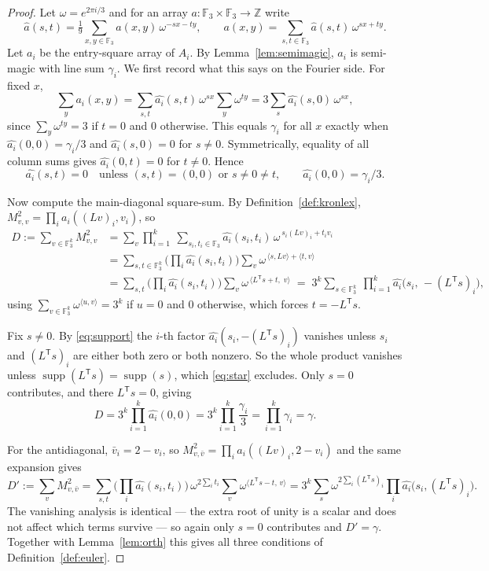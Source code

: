 \documentclass[11pt,a4paper]{amsart}
\theoremstyle{plain}
\theoremstyle{definition}
\theoremstyle{remark}
\newcommand{\FF}{\mathbb{F}}
\newcommand{\ZZ}{\mathbb{Z}}
\newcommand{\supp}{\operatorname{supp}}
\newcommand{\tr}{\mathsf{T}}
\begin{document}
\begin{proof}
Let $\omega=e^{2\pi i/3}$ and for an array $a:\FF_3\times\FF_3\to\ZZ$ write
\[
\widehat a(s,t)=\tfrac19\sum_{x,y\in\FF_3}a(x,y)\,\omega^{-sx-ty},
\qquad
a(x,y)=\sum_{s,t\in\FF_3}\widehat a(s,t)\,\omega^{sx+ty}.
\]
Let $a_i$ be the entry-square array of $A_i$. By Lemma~\ref{lem:semimagic},
$a_i$ is semi-magic with line sum $\gamma_i$. We first record what this says on
the Fourier side. For fixed $x$,
\[
\sum_{y}a_i(x,y)=\sum_{s,t}\widehat{a_i}(s,t)\,\omega^{sx}\sum_{y}\omega^{ty}
=3\sum_{s}\widehat{a_i}(s,0)\,\omega^{sx},
\]
since $\sum_y\omega^{ty}=3$ if $t=0$ and $0$ otherwise. This equals $\gamma_i$
for all $x$ exactly when $\widehat{a_i}(0,0)=\gamma_i/3$ and
$\widehat{a_i}(s,0)=0$ for $s\ne0$. Symmetrically, equality of all column sums
gives $\widehat{a_i}(0,t)=0$ for $t\ne0$. Hence
\begin{equation}\label{eq:support}
\widehat{a_i}(s,t)=0 \quad\text{unless } (s,t)=(0,0) \text{ or } s\ne0\ne t,
\qquad \widehat{a_i}(0,0)=\gamma_i/3 .
\end{equation}

Now compute the main-diagonal square-sum. By
Definition~\ref{def:kronlex}, $M_{v,v}^2=\prod_i a_i((Lv)_i,v_i)$, so
\begin{align*}
D:=\sum_{v\in\FF_3^k}M_{v,v}^2
&=\sum_{v}\prod_{i=1}^{k}\ \sum_{s_i,t_i\in\FF_3}
   \widehat{a_i}(s_i,t_i)\,\omega^{\,s_i(Lv)_i+t_iv_i}\\
&=\sum_{s,t\in\FF_3^k}\Big(\prod_i\widehat{a_i}(s_i,t_i)\Big)
   \sum_{v}\omega^{\,\langle s,Lv\rangle+\langle t,v\rangle}\\
&=\sum_{s,t}\Big(\prod_i\widehat{a_i}(s_i,t_i)\Big)
   \sum_{v}\omega^{\,\langle L^{\tr}s+t,\;v\rangle}
\;=\;3^k\sum_{s\in\FF_3^k}\ \prod_{i=1}^{k}
   \widehat{a_i}\big(s_i,\,-(L^{\tr}s)_i\big),
\end{align*}
using $\sum_{v\in\FF_3^k}\omega^{\langle u,v\rangle}=3^k$ if $u=0$ and $0$
otherwise, which forces $t=-L^{\tr}s$.

Fix $s\ne0$. By \eqref{eq:support} the $i$-th factor
$\widehat{a_i}(s_i,-(L^{\tr}s)_i)$ vanishes unless $s_i$ and $(L^{\tr}s)_i$ are
either both zero or both nonzero. So the whole product vanishes unless
$\supp(L^{\tr}s)=\supp(s)$, which \eqref{eq:star} excludes. Only $s=0$
contributes, and there $L^{\tr}s=0$, giving
\[
D=3^k\prod_{i=1}^{k}\widehat{a_i}(0,0)=3^k\prod_{i=1}^{k}\frac{\gamma_i}{3}
=\prod_{i=1}^{k}\gamma_i=\gamma .
\]

For the antidiagonal, $\bar v_i=2-v_i$, so
$M_{v,\bar v}^2=\prod_i a_i((Lv)_i,2-v_i)$ and the same expansion gives
\[
D':=\sum_{v}M_{v,\bar v}^2
=\sum_{s,t}\Big(\prod_i\widehat{a_i}(s_i,t_i)\Big)\,\omega^{2\sum_i t_i}
  \sum_{v}\omega^{\langle L^{\tr}s-t,\,v\rangle}
=3^k\sum_{s}\omega^{2\sum_i (L^{\tr}s)_i}\prod_{i}
  \widehat{a_i}\big(s_i,(L^{\tr}s)_i\big).
\]
The vanishing analysis is identical --- the extra root of unity is a scalar and
does not affect which terms survive --- so again only $s=0$ contributes and
$D'=\gamma$. Together with Lemma~\ref{lem:orth} this gives all three conditions
of Definition~\ref{def:euler}.
\end{proof}
\end{document}
